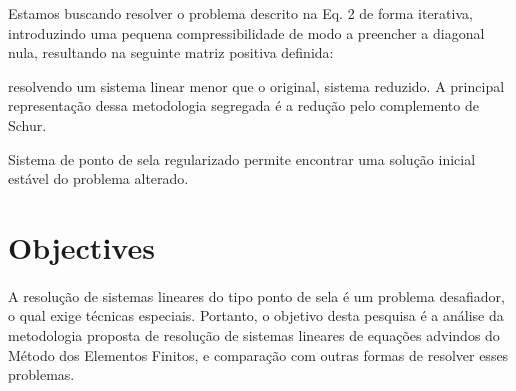\documentclass[12pt]{article}
\begin{document}

Estamos buscando resolver o problema descrito na Eq. 2 de forma iterativa, introduzindo uma pequena compressibilidade de modo a preencher a 
diagonal nula, resultando na seguinte matriz positiva definida: %



resolvendo um sistema linear menor que o original, sistema reduzido. A principal representação dessa metodologia segregada é a redução pelo complemento de Schur.
 





Sistema de ponto de sela regularizado permite encontrar uma solução inicial estável do problema alterado.

\section{Objectives}
\paragraph{}
A resolução de sistemas lineares do tipo ponto de sela é um problema desafiador, o qual exige técnicas especiais. Portanto, o objetivo
desta pesquisa é a análise da metodologia proposta de resolução de sistemas lineares de equações advindos do Método dos Elementos Finitos, 
e comparação com outras formas de resolver esses problemas. 


\end{document}
